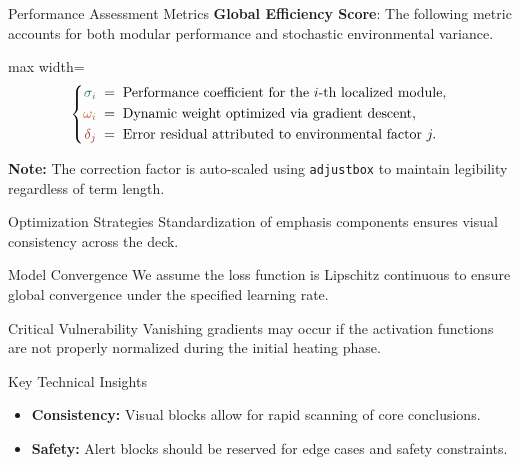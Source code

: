 \begin{frame}{Performance Assessment Metrics}
  \textbf{Global Efficiency Score}: The following metric accounts for both modular performance and stochastic environmental variance.


  \begin{adjustbox}{max width=\textwidth}
  \[
    \left\{
    \begin{aligned}
      \textcolor{mygreen}{\sigma_i} &\;=\; \text{Performance coefficient for the } i\text{-th localized module}, \\
      \textcolor{myorange}{\omega_i} &\;=\; \text{Dynamic weight optimized via gradient descent}, \\
      \textcolor{myred}{\delta_j} &\;=\; \text{Error residual attributed to environmental factor } j.
    \end{aligned}
    \right.
  \]
  \end{adjustbox}

  \vspace{0.5em}
  \small \textbf{Note:} The correction factor is auto-scaled using \texttt{adjustbox} to maintain legibility regardless of term length.
\end{frame}

\begin{frame}{Optimization Strategies}
  Standardization of emphasis components ensures visual consistency across the deck.

  \begin{block}{Model Convergence}
    We assume the loss function is Lipschitz continuous to ensure global convergence under the specified learning rate.
  \end{block}

  \begin{alertblock}{Critical Vulnerability}
    Vanishing gradients may occur if the activation functions are not properly normalized during the initial heating phase.
  \end{alertblock}

  \begin{exampleblock}{Key Technical Insights}
    \begin{itemize}
        \item \textbf{Consistency:} Visual blocks allow for rapid scanning of core conclusions.
        \item \textbf{Safety:} Alert blocks should be reserved for edge cases and safety constraints.
    \end{itemize}
  \end{exampleblock}
\end{frame}

